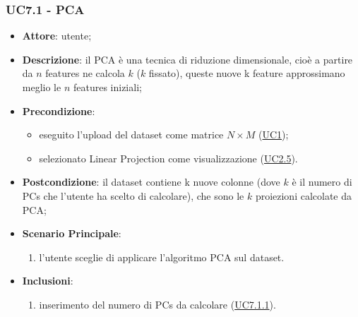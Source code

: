    \subsubsection{UC7.1 - PCA}
    \label{uc7.1}
    \begin{itemize}
    \item \textbf{Attore}: utente;
    \item \textbf{Descrizione}: il PCA è una tecnica di riduzione dimensionale, cioè a partire da $n$ features ne calcola $k$ ($k$ fissato), queste nuove k feature approssimano meglio le $n$ features iniziali;
    \item \textbf{Precondizione}: 
    \begin{itemize}
        \item eseguito l'upload del dataset come matrice $N\times M$ (\hyperref[uc1]{UC1});
        \item selezionato Linear Projection come visualizzazione (\hyperref[uc2.5]{UC2.5}).
    \end{itemize}  
    \item \textbf{Postcondizione}: il dataset contiene k nuove colonne (dove $k$ è il numero di PCs che l'utente ha scelto di calcolare), che sono le $k$ proiezioni calcolate da PCA;
    \item \textbf{Scenario Principale}: 
    \begin{enumerate}
        \item l'utente sceglie di applicare l'algoritmo PCA sul dataset.
    \end{enumerate}  
    \item \textbf{Inclusioni}:
        \begin{enumerate}
            \item inserimento del numero di PCs da calcolare (\hyperref[uc7.1.1]{UC7.1.1}).
        \end{enumerate} 
    \end{itemize}
    
